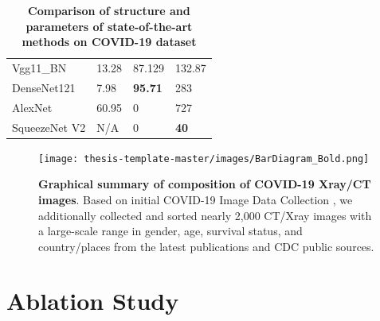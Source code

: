 \begin{table}[h]
\begin{tabular}{@{}llll@{}}
Vgg11\_BN     & 13.28                                                                           & 87.129                                                                            & 132.87                                                                        \\
DenseNet121   & 7.98                                                                            & {\color[HTML]{CB0000} \textbf{95.71}}                                             & 283                                                                           \\
AlexNet       & 60.95                                                                           & 0                                                                                 & 727                                                                           \\
SqueezeNet V2 & {\color[HTML]{000000} N/A}                                                      & 0                                                                                 & {\color[HTML]{CB0000} \textbf{40}}                                            \\ \bottomrule
\end{tabular}
\caption{\textbf{Comparison of structure and parameters of state-of-the-art methods on COVID-19 dataset}}
\end{table}

\begin{figure}[b]
\texttt{[image: thesis-template-master/images/BarDiagram\_Bold.png]}
\label{fig}
\centering
\caption{\textbf{Graphical summary of composition of COVID-19 Xray/CT images}. Based on initial COVID-19 Image Data Collection \cite{37}, we additionally collected and sorted nearly 2,000 CT/Xray images with a large-scale range in gender, age, survival status, and country/places from the latest publications and CDC public sources\cite{36}\cite{37}\cite{38}. }
\end{figure}


\chapter{Ablation Study}
\label{sec:examples}

